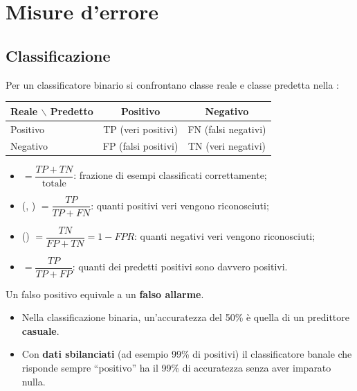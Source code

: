 \section{Misure d'errore}
\label{sec:misure}

\subsection{Classificazione}

Per un classificatore binario si confrontano classe reale e classe predetta nella :

\begin{center}\small
\begin{tabular}{l|cc}
Reale $\backslash$ Predetto & Positivo & Negativo\\
\hline
Positivo & TP (veri positivi) & FN (falsi negativi)\\
Negativo & FP (falsi positivi) & TN (veri negativi)\\
\end{tabular}
\end{center}

\begin{itemize}
  \item {} $= \dfrac{TP+TN}{\text{totale}}$: frazione di esempi classificati correttamente;
  \item {} (, ) $= \dfrac{TP}{TP+FN}$: quanti positivi
        veri vengono riconosciuti;
  \item {} () $= \dfrac{TN}{FP+TN} = 1-FPR$: quanti negativi veri
        vengono riconosciuti;
  \item {} $= \dfrac{TP}{TP+FP}$: quanti dei predetti positivi sono davvero positivi.
\end{itemize}
Un falso positivo equivale a un \textbf{falso allarme}.

\begin{attenzione}
\begin{itemize}
  \item Nella classificazione binaria, un'accuratezza del 50\% è quella di un predittore \textbf{casuale}.
  \item Con \textbf{dati sbilanciati} (ad esempio 99\% di positivi) il classificatore banale che risponde sempre
        ``positivo'' ha il 99\% di accuratezza senza aver imparato nulla.
\end{itemize}
\end{attenzione}

